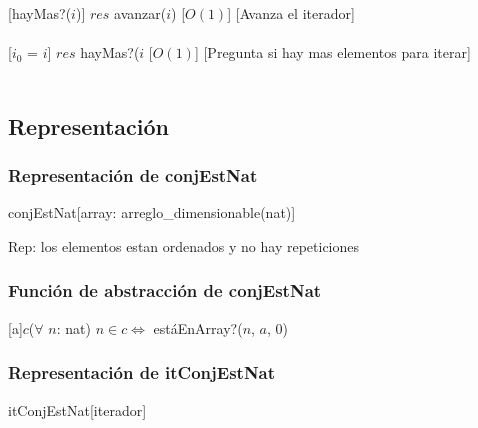   [hayMas?($i$)]
  {$res$ \igobs avanzar($i$)}
  [$O(1)$]
  [Avanza el iterador]\\\\
  
  [$i_{0}$ = $i$]
  {$res$ \igobs hayMas?($i$}
  [$O(1)$]
  [Pregunta si hay mas elementos para iterar]\\\\
\subsection{Representaci\'on}
\subsubsection{Representaci\'on de conjEstNat}
\begin{Estructura}{conjEstNat}[array: arreglo\_dimensionable(nat)]\end{Estructura}
 	Rep: los elementos estan ordenados y no hay repeticiones
  \subsubsection{Funci\'on de abstracci\'on de conjEstNat}
 	
 	[a]{$c$}{($\forall$ $n$: nat) $n \in c \Leftrightarrow$ est\'aEnArray?($n$, $a$, 0)}
 	
 	
\subsubsection{Representaci\'on de itConjEstNat}
\begin{Estructura}{itConjEstNat}[iterador]
	\begin{Tupla}[iterador]
	\end{Tupla}
\end{Estructura}

